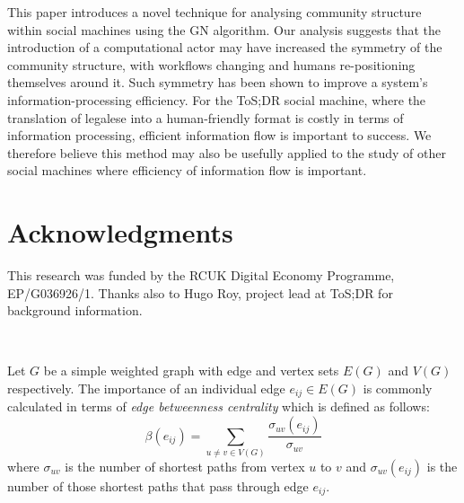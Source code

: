 \documentclass{sig-alternate-2013}
\begin{document}
This paper introduces a novel technique for analysing community structure within social machines using the GN algorithm. Our analysis suggests that the introduction of a computational actor may have increased the symmetry of the community structure, with workflows changing and humans re-positioning themselves around it. Such symmetry has been shown to improve a system's information-processing efficiency. For the ToS;DR social machine, where the translation of legalese into a human-friendly format is costly in terms of information processing, efficient information flow is important to success. We therefore believe this method may also be usefully applied to the study of other social machines where efficiency of information flow is important.


\section{Acknowledgments}
This research was funded by the RCUK Digital Economy Programme, EP/G036926/1. Thanks also to Hugo Roy, project lead at ToS;DR for background information.

%

%
%
\
\label{Girvan and Newman Algorithm}

Let $G$ be a simple weighted graph with edge and vertex sets $E(G)$ and $V(G)$  respectively.  The importance of an individual edge $e_{ij} \in E(G)$ is commonly calculated in terms of \emph{edge betweenness centrality} which is defined as follows:
\[\beta(e_{ij}) = \sum_{ u\neq v \in V(G)} \frac{\sigma_{uv}(e_{ij})}{\sigma_{uv}}\]
where $\sigma_{uv}$ is the number of shortest paths from vertex $u$ to $v$ and $\sigma_{uv}(e_{ij})$ is the number of those shortest paths that pass through edge $e_{ij}$.  
\end{document}
